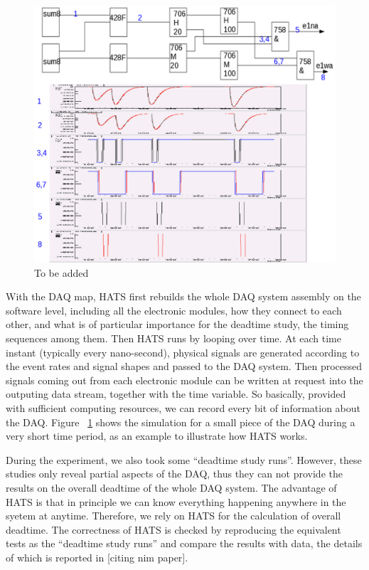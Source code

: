 \begin{figure}[!p]
\centering
\includegraphics{DW/hats_example.eps}
\caption{To be added}\label{fig:hats_example}
\end{figure}


With the DAQ map, HATS first rebuilds the whole DAQ system assembly on the software level, including all the electronic modules, how they connect to each other, and what is of particular importance for the deadtime study, the timing sequences among them. Then HATS runs by looping over time. At each time instant (typically every nano-second), physical signals are generated according to the event rates and signal shapes and passed to the DAQ system. Then processed signals coming out from each electronic module can be written at request into the outputing data stream, together with the time variable. So basically, provided with sufficient computing resources, we can record every bit of information about the DAQ. Figure ~\ref{fig:hats_example} shows the simulation for a small piece of the DAQ during a very short time period, as an example to illustrate how HATS works. 



During the experiment, we also took some ``deadtime study
runs''. However, these studies only reveal partial aspects of the DAQ,
thus they can not provide the results on the overall deadtime of the
whole DAQ system. The advantage of HATS is that in principle we can
know everything happening anywhere in the syetem at
anytime. Therefore, we rely on HATS for the calculation of overall
deadtime. The correctness of HATS is checked by reproducing the
equivalent tests as the ``deadtime study runs'' and compare the
results with data, the details of which is reported in [citing nim
paper].



